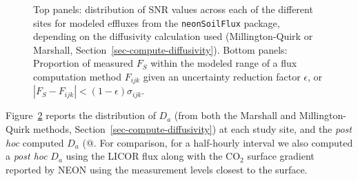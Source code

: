 \documentclass[
  letterpaper,
  DIV=11,
  numbers=noendperiod]{scrartcl}
\begin{document}
\begin{figure}


\caption{\label{fig-uncertainty-stats}Top panels: distribution of SNR
values across each of the different sites for modeled effluxes from the
\texttt{neonSoilFlux} package, depending on the diffusivity calculation
used (Millington-Quirk or Marshall,
Section~\ref{sec-compute-diffusivity}). Bottom panels: Proportion of
measured \(F_{S}\) within the modeled range of a flux computation method
\(F_{ijk}\) given an uncertainty reduction factor \(\epsilon\), or
\(| F_{S} - F_{ijk} | < (1-\epsilon) \sigma_{ijk}\).}

\end{figure}%

Figure~\ref{fig-diffusivity-plot} reports the distribution of \(D_{a}\)
(from both the Marshall and Millington-Quirk methods,
Section~\ref{sec-compute-diffusivity}) at each study site, and the
\emph{post hoc} computed \(D_{a}\) (@. For comparison, for a half-hourly
interval we also computed a \emph{post hoc} \(D_{a}\) using the LICOR
flux along with the CO\(_{2}\) surface gradient reported by NEON using
the measurement levels closest to the surface.

\begin{figure}


\caption{\label{fig-diffusivity-plot}}

\end{figure}%
\end{document}
